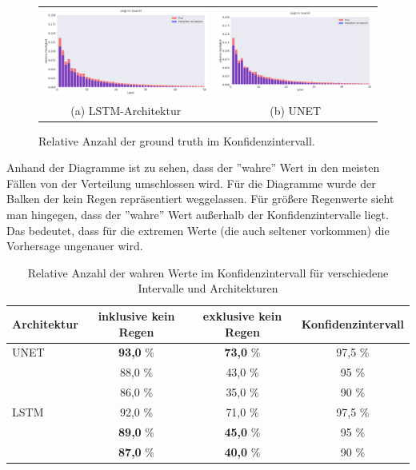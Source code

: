 \begin{figure}[h]
\centering
\begin{tabular}{cc}
\includegraphics[width=80mm]{abb/dist_LSTM.png}&
\includegraphics[width=80mm]{abb/dist_UNET.png}\\
(a) \small{LSTM-Architektur} & (b) \small{UNET}
\end{tabular}
\caption{Relative Anzahl der ground truth im Konfidenzintervall. \label{fig:dist}}
\end{figure}

\noindent Anhand der Diagramme ist zu sehen, dass der ''wahre'' Wert in den meisten Fällen von der Verteilung umschlossen wird. Für die Diagramme wurde der Balken der kein Regen repräsentiert weggelassen. Für größere Regenwerte sieht man hingegen, dass der ''wahre'' Wert außerhalb der Konfidenzintervalle liegt. Das bedeutet, dass für die extremen Werte (die auch seltener vorkommen)
die Vorhersage ungenauer wird.


\begin{table}[h]
\centering
\begin{tabular}[h]{l|c|c|c}
Architektur & inklusive kein Regen & exklusive kein Regen & Konfidenzintervall \\
\hline
UNET & \textbf{93,0} \% & \textbf{73,0} \%  & 97,5 \%\\
 & 88,0 \% & 43,0 \% & 95 \% \\
 & 86,0 \% & 35,0 \% & 90 \% \\
 \hline
LSTM &92,0 \% & 71,0 \% & 97,5 \% \\
 &\textbf{89,0} \% & \textbf{45,0} \% & 95 \% \\
 &\textbf{87,0} \% & \textbf{40,0} \% & 90 \% \\

\end{tabular}
\caption{ Relative Anzahl der wahren Werte im Konfidenzintervall für verschiedene Intervalle und Architekturen\label{tab:konv}}
\end{table}


